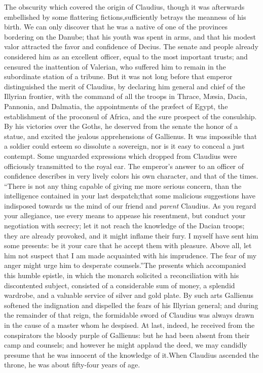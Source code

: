 
The obscurity which covered the origin of Claudius, though it was
afterwards embellished by some flattering fictions,\footnotemark[3]
sufficiently betrays the meanness of his birth. We can only
discover that he was a native of one of the provinces bordering
on the Danube; that his youth was spent in arms, and that his
modest valor attracted the favor and confidence of Decius. The
senate and people already considered him as an excellent officer,
equal to the most important trusts; and censured the inattention
of Valerian, who suffered him to remain in the subordinate
station of a tribune. But it was not long before that emperor
distinguished the merit of Claudius, by declaring him general and
chief of the Illyrian frontier, with the command of all the
troops in Thrace, Mæsia, Dacia, Pannonia, and Dalmatia, the
appointments of the præfect of Egypt, the establishment of the
proconsul of Africa, and the sure prospect of the consulship. By
his victories over the Goths, he deserved from the senate the
honor of a statue, and excited the jealous apprehensions of
Gallienus. It was impossible that a soldier could esteem so
dissolute a sovereign, nor is it easy to conceal a just contempt.
Some unguarded expressions which dropped from Claudius were
officiously transmitted to the royal ear. The emperor’s answer to
an officer of confidence describes in very lively colors his own
character, and that of the times. “There is not any thing capable
of giving me more serious concern, than the intelligence
contained in your last despatch;\footnotemark[4] that some malicious
suggestions have indisposed towards us the mind of our friend and
\textit{parent} Claudius. As you regard your allegiance, use every means
to appease his resentment, but conduct your negotiation with
secrecy; let it not reach the knowledge of the Dacian troops;
they are already provoked, and it might inflame their fury. I
myself have sent him some presents: be it your care that he
accept them with pleasure. Above all, let him not suspect that I
am made acquainted with his imprudence. The fear of my anger
might urge him to desperate counsels.”\footnotemark[5] The presents which
accompanied this humble epistle, in which the monarch solicited a
reconciliation with his discontented subject, consisted of a
considerable sum of money, a splendid wardrobe, and a valuable
service of silver and gold plate. By such arts Gallienus softened
the indignation and dispelled the fears of his Illyrian general;
and during the remainder of that reign, the formidable sword of
Claudius was always drawn in the cause of a master whom he
despised. At last, indeed, he received from the conspirators the
bloody purple of Gallienus: but he had been absent from their
camp and counsels; and however he might applaud the deed, we may
candidly presume that he was innocent of the knowledge of it.\footnotemark[6]
When Claudius ascended the throne, he was about fifty-four years
of age.

